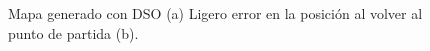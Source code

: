 \begin{figure}[H]
\begin{center}
\hspace{0.5cm}
\end{center}
\caption{Mapa generado con DSO (a) Ligero error en la posición al volver al punto de partida (b).}
\end{figure}

\clearpage

